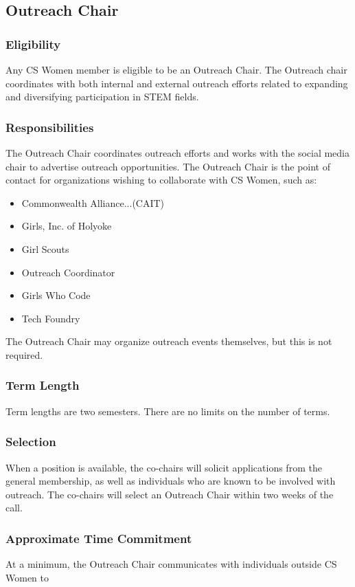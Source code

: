 \subsection{Outreach Chair}
\label{sec:outreach}

\subsubsection{Eligibility}
Any CS Women member is eligible to be an Outreach Chair. The Outreach chair coordinates with both internal and external outreach efforts related to expanding and diversifying participation in STEM fields.

\subsubsection{Responsibilities}
The Outreach Chair coordinates outreach efforts and works with the social media chair to advertise outreach opportunities. The Outreach Chair is the point of contact for organizations wishing to collaborate with CS Women, such as:
\begin{itemize}
	\item Commonwealth Alliance...(CAIT)
	\item Girls, Inc. of Holyoke
	\item Girl Scouts
	\item \gwis{} Outreach Coordinator
	\item Girls Who Code
	\item Tech Foundry
\end{itemize}
The Outreach Chair may organize outreach events themselves, but this is not required.

\subsubsection{Term Length}
Term lengths are two semesters. There are no limits on the number of terms.

\subsubsection{Selection}
When a position is available, the co-chairs will solicit applications from the general membership, as well as individuals who are known to be involved with outreach. The co-chairs will select an Outreach Chair within two weeks of the call. 

\subsubsection{Approximate Time Commitment}
At a minimum, the Outreach Chair communicates with individuals outside CS Women to 